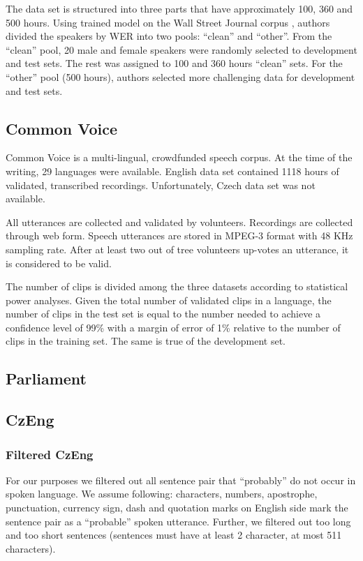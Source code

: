 The data set is structured into three parts that have approximately 100, 360 and 500 hours. Using trained model on the Wall Street Journal corpus , authors divided the speakers by WER into two pools: ``clean'' and ``other''. From the ``clean'' pool, 20 male and female speakers were randomly selected to development and test sets. The rest was assigned to 100 and 360 hours ``clean'' sets. For the ``other'' pool (500 hours), authors selected more challenging data for development and test sets.

\subsection{Common Voice}

Common Voice  is a multi-lingual, crowdfunded speech corpus. At the time of the writing, 29 languages were available. English data set contained 1118 hours of validated, transcribed recordings. Unfortunately, Czech data set was not available.

All utterances are collected and validated by volunteers. Recordings are collected through web form. Speech utterances are stored in MPEG-3 format with 48 KHz sampling rate. After at least two out of tree volunteers up-votes an utterance, it is considered to be valid.

The number of clips is divided among the three datasets according to statistical power analyses.  Given the total number of validated clips in a language, the number of clips in the test set is equal to the number needed to achieve a confidence level of 99\% with a margin of error of 1\% relative to the number of clips in the training set.  The same is true of the development set.

\subsection{Parliament}

\subsection{CzEng}

\subsubsection{Filtered CzEng}
\label{filtered_czeng}
For our purposes we filtered out all sentence pair that ``probably'' do not occur in spoken language. We assume following: characters, numbers, apostrophe, punctuation, currency sign, dash and quotation marks on English side mark the sentence pair as a ``probable'' spoken utterance. Further, we filtered out too long and too short sentences (sentences must have at least 2 character, at most 511 characters).


